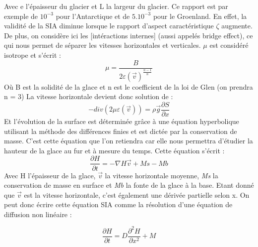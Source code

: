 \documentclass{article}
\begin{document}
Avec e l'épaisseur du glacier et L la largeur du glacier. Ce rapport est par exemple de $10^{-3}$ pour l'Antarctique et de $5.10^{-3}$ pour le Groenland. En effet, la validité de la SIA diminue lorsque le rapport d'aspect caractéristique $\zeta$ augmente. 
\newline
De plus, on considère ici les [intéractions internes] (aussi appelés bridge effect), ce qui nous permet de séparer les vitesses horizontales et verticales. $\mu$ est considéré isotrope et s'écrit :
\begin{equation}
\mu = \frac{B}{2\varepsilon(\vec{v})^\frac{n-1}{n}}
\label{eq2} 
\end{equation}
Où B est la solidité de la glace et n est le coefficient de la loi de Glen (on prendra n = 3)
\newline
La vitesse horizontale devient donc solution de :
\begin{equation}
-div(2 \mu \varepsilon(\vec{v}))  = \rho \vec{g}\frac{{\partial}S}{\partial x}
\label{eq3}
\end{equation}
Et l'évolution de la surface est déterminée grâce à une équation hyperbolique utilisant la méthode des différences finies et est dictée par la conservation de masse. C'est cette équation que l'on retiendra car elle nous permettra d'étudier la hauteur de la glace au fur et à mesure du temps.
Cette équation s'écrit :
\begin{equation}
\frac{\partial H}{\partial t}=-\nabla H\vec{v} + Ms - Mb
\label{eq3}
\end{equation}
Avec H l'épaisseur de la glace, $\vec{v}$ la vitesse horizontale moyenne, \textit{Ms} la conservation de masse en surface et \textit{Mb} la fonte de la glace à la base.
Etant donné que $\vec{v}$ est la vitesse horizontale, c'est également une dérivée partielle selon x.
On peut donc écrire cette équation SIA comme la résolution d'une équation de diffusion non linéaire : 

\begin{equation}
\frac{\partial H}{\partial t}=D\frac{{\partial}^{2}H}{\partial x^{2}} + M
\label{eq4}
\end{equation}
\end{document}
